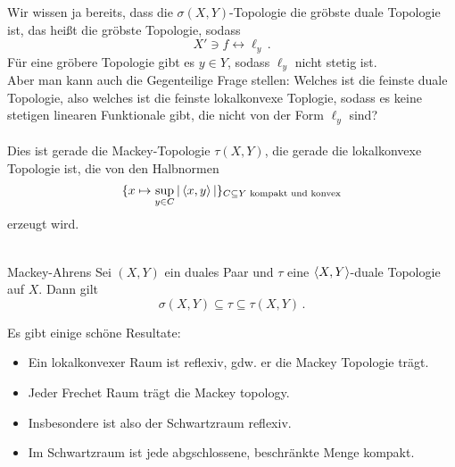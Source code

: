 \documentclass{article}
\begin{document}
	Wir wissen ja bereits, dass die $\sigma(X,Y)$-Topologie die gröbste duale Topologie ist, das heißt die gröbste Topologie, sodass
	\[X'\ni f\leftrightarrow \ell_y\,.\]
	Für eine gröbere Topologie gibt es $y\in Y$, sodass $\ell_y$ nicht stetig ist.\\
	Aber man kann auch die Gegenteilige Frage stellen: Welches ist die feinste duale Topologie, also welches ist die feinste lokalkonvexe Toplogie, sodass es keine stetigen linearen Funktionale gibt, die nicht von der Form $\ell_y$ sind?\\
	\\
	Dies ist gerade die Mackey-Topologie $\tau(X,Y)$, die gerade die lokalkonvexe Topologie ist, die von den Halbnormen
	\[\{x\mapsto \sup_{y\in C}|\left\langle x,y\right\rangle|\}_{C\subseteq Y\text{ kompakt und konvex}}\]
	erzeugt wird.\\
	\\
	\begin{Satz}{Mackey-Ahrens}{}
		Sei $(X,Y)$ ein duales Paar und $\tau$ eine $\left\langle X,Y\right\rangle$-duale Topologie auf $X$. Dann gilt
		\[\sigma(X,Y)\subseteq \tau\subseteq \tau(X,Y)\,.\]
	\end{Satz}
	
	Es gibt einige schöne Resultate:
	\begin{itemize}
		\item Ein lokalkonvexer Raum ist reflexiv, gdw. er die Mackey Topologie trägt.
		\item Jeder Frechet Raum trägt die Mackey topology.
		\item Insbesondere ist also der Schwartzraum reflexiv.
		\item Im Schwartzraum ist jede abgschlossene, beschränkte Menge kompakt.
	\end{itemize}
	
	
	
	
\end{document}
